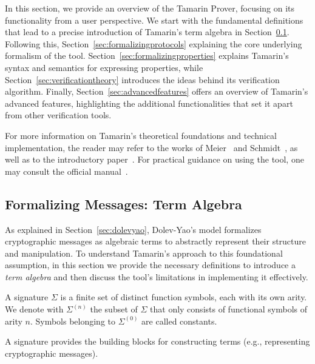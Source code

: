 In this section, we provide an overview of the Tamarin Prover, focusing on its functionality from a user perspective. We start with the fundamental definitions that lead to a precise introduction of Tamarin's term algebra in Section~\ref{sec:formalizingmessages}. Following this, Section~\ref{sec:formalizingprotocols} explaining the core underlying formalism of the tool. Section~\ref{sec:formalizingproperties} explains Tamarin's syntax and semantics for expressing properties, while Section~\ref{sec:verificationtheory} introduces the ideas behind its verification algorithm. Finally, Section~\ref{sec:advancedfeatures} offers an overview of Tamarin's advanced features, highlighting the additional functionalities that set it apart from other verification tools.

For more information on Tamarin's theoretical foundations and technical implementation, the reader may refer to the works of Meier~\cite{meierThesis} and Schmidt~\cite{schmidtThesis}, as well as to the introductory paper~\cite{TamarinFoundations}. For practical guidance on using the tool, one may consult the official manual~\cite{tamarinManual}.

\subsection{Formalizing Messages: Term Algebra}
\label{sec:formalizingmessages}

As explained in Section~\ref{sec:dolevyao}, Dolev-Yao's model formalizes cryptographic messages as algebraic terms to abstractly represent their structure and manipulation. To understand Tamarin's approach to this foundational assumption, in this section we provide the necessary definitions to introduce a \textit{term algebra} and then discuss the tool's limitations in implementing it effectively.

\begin{definition}[Signature]
    A signature $\Sigma$ is a finite set of distinct function symbols, each with its own arity. We denote with $\Sigma^{(n)}$ the subset of $\Sigma$ that only consists of functional symbols of arity $n$. Symbols belonging to $\Sigma^{(0)}$ are called constants.
\end{definition}

A signature provides the building blocks for constructing terms (e.g., representing cryptographic messages).

